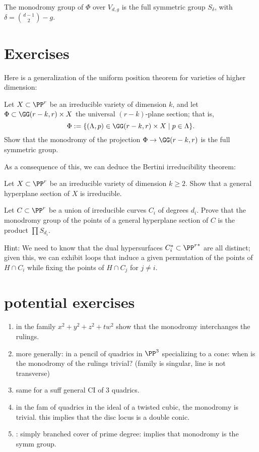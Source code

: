 \begin{proposition}
The monodromy group of $\Phi$ over $V_{d,g}$ is the full symmetric group $S_\delta$, with $\delta = \binom{d-1}{2} - g$.
\end{proposition}



\section{Exercises}

Here is a generalization of the uniform position theorem for varieties of higher dimension:

\begin{exercise}
Let $X \subset \PP^r$ be an irreducible variety of dimension $k$, and let $\Phi \subset \GG(r-k, r) \times X$ the universal $(r-k)$-plane section; that is,
$$
\Phi := \{ (\Lambda, p) \in \GG(r-k,r) \times X \mid p \in \Lambda \}.
$$
Show that the monodromy of the projection $\Phi \to \GG(r-k,r)$ is the full symmetric group.
\end{exercise}

As a consequence of this, we can deduce the Bertini irreducibility theorem:

\begin{exercise}
Let $X \subset \PP^r$ be an irreducible variety of dimension $k \geq 2$. Show that a general hyperplane section of $X$ is irreducible.
\end{exercise}

\begin{exercise}
Let $C \subset \PP^r$ be a union of irreducible curves $C_i$ of degrees $d_i$. Prove that the monodromy group of the points of a general hyperplane section of $C$ is the product $\prod S_{d_i}$.
\end{exercise}

Hint: We need to know that the dual hypersurfaces $C_i^* \subset {\PP^r}^*$ are all distinct; given this, we can exhibit loops that induce a given permutation of the points of $H \cap C_i$ while fixing the points of $H \cap C_j$ for $j \neq i$.

\section{potential exercises}
\begin{enumerate}
 \item in the family $x^2+y^2 +z^2+tw^2$ show that the monodromy interchanges the rulings.
 \item more generally: in a pencil of quadrics in $\PP^3$ specializing to a cone: when is the monodromy of the rulings trivial? (family is singular, line is not transverse)
 \item same for a suff general CI of 3 quadrics.
 \item in the fam of quadrics in the ideal of a twisted cubic, the monodromy is trivial. this implies that the disc locus is a double conic.
 \item: simply branched cover of prime degree: implies that monodromy is the symm group.
 
\end{enumerate}



